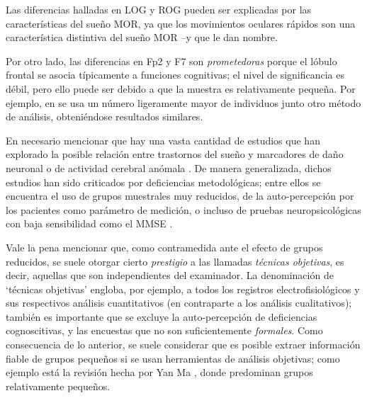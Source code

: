 \documentclass[12pt,letterpaper]{book}
\begin{document}
Las diferencias halladas en LOG y ROG pueden ser explicadas por las características del sueño MOR, ya que los movimientos oculares rápidos son una característica distintiva del sueño MOR --y que le dan nombre.

Por otro lado, las diferencias en Fp2 y F7 son \textit{prometedoras} porque el lóbulo frontal se asocia típicamente a funciones cognitivas; el nivel de significancia es débil, pero ello puede ser debido a que la muestra es relativamente pequeña.
%
Por ejemplo, en \cite{FRONTIERS} se usa un número ligeramente mayor de individuos junto otro método de análisis, obteniéndose resultados similares.




En necesario mencionar que hay una vasta cantidad de estudios que han explorado la posible relación entre trastornos del sueño y marcadores de daño neuronal o de actividad cerebral anómala \cite{porter15}.
%
De manera generalizada, dichos estudios han sido criticados por deficiencias metodológicas; entre ellos se encuentra el uso de grupos muestrales muy reducidos, de la auto-percepción por los pacientes como parámetro de medición, o incluso de pruebas neuropsicológicas con baja sensibilidad como el MMSE \cite{scullin15}.


Vale la pena mencionar que, como {contramedida} ante el efecto de grupos reducidos, se suele otorgar cierto \textit{prestigio} a las llamadas \textit{técnicas objetivas}, es decir, aquellas que son independientes del examinador.
%
La denominación de `técnicas objetivas' engloba, por ejemplo, a todos los registros electrofisiológicos y sus respectivos análisis cuantitativos (en contraparte a los análisis cualitativos); también es importante que se excluye la auto-percepción de deficiencias cognoscitivas, y las encuestas que no son suficientemente \textit{formales}.
%
%
Como consecuencia de lo anterior, se suele considerar que es posible extraer información fiable de grupos pequeños si se usan herramientas de análisis objetivas; como ejemplo está la revisión hecha por Yan Ma \cite{ma18}, donde predominan grupos relativamente pequeños.
\end{document}
